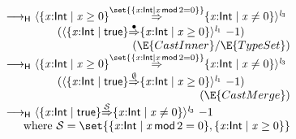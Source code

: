 \documentclass[9pt]{extarticle}
\newcommand{\ottnt}[1]{\mathit{#1}}
\newcommand{\ottsym}[1]{#1}
\begin{document}
{\begin{figure}[t]
\[\begin{array}{r@{~}l}
  \longrightarrow _{  \mathsf{H}  }  &  \langle   \{ \mathit{x} \mathord{:}  \mathsf{Int}  \mathrel{\mid}  \mathit{x}  \mathrel{\ge}  \ottsym{0}  \}   \mathord{ \overset{  \set{   \{ \mathit{x} \mathord{:}  \mathsf{Int}  \mathrel{\mid}  \mathit{x} \,  \mathsf{mod}  \, \ottsym{2}  \mathrel{=}  \ottsym{0}  \}   }  }{\Rightarrow} }   \{ \mathit{x} \mathord{:}  \mathsf{Int}  \mathrel{\mid}  \mathit{x}  \mathrel{\ne}  \ottsym{0}  \}   \rangle^{ \ottnt{l_{{\mathrm{3}}}} } ~  {} \\  &  \qquad   (  \langle   \{ \mathit{x} \mathord{:}  \mathsf{Int}  \mathrel{\mid}  \mathsf{true}  \}   \mathord{ \overset{\bullet}{\Rightarrow} }   \{ \mathit{x} \mathord{:}  \mathsf{Int}  \mathrel{\mid}  \mathit{x}  \mathrel{\ge}  \ottsym{0}  \}   \rangle^{ \ottnt{l_{{\mathrm{1}}}} } ~   {-1}   )   \\
 \multicolumn{2}{r}{(\E{CastInner}/\E{TypeSet})} \\ 
  \longrightarrow _{  \mathsf{H}  }  &  \langle   \{ \mathit{x} \mathord{:}  \mathsf{Int}  \mathrel{\mid}  \mathit{x}  \mathrel{\ge}  \ottsym{0}  \}   \mathord{ \overset{  \set{   \{ \mathit{x} \mathord{:}  \mathsf{Int}  \mathrel{\mid}  \mathit{x} \,  \mathsf{mod}  \, \ottsym{2}  \mathrel{=}  \ottsym{0}  \}   }  }{\Rightarrow} }   \{ \mathit{x} \mathord{:}  \mathsf{Int}  \mathrel{\mid}  \mathit{x}  \mathrel{\ne}  \ottsym{0}  \}   \rangle^{ \ottnt{l_{{\mathrm{3}}}} } ~  {} \\  &  \qquad   (  \langle   \{ \mathit{x} \mathord{:}  \mathsf{Int}  \mathrel{\mid}  \mathsf{true}  \}   \mathord{ \overset{ \emptyset }{\Rightarrow} }   \{ \mathit{x} \mathord{:}  \mathsf{Int}  \mathrel{\mid}  \mathit{x}  \mathrel{\ge}  \ottsym{0}  \}   \rangle^{ \ottnt{l_{{\mathrm{1}}}} } ~   {-1}   )   \\
 \multicolumn{2}{r}{(\E{CastMerge})} \\
  \longrightarrow _{  \mathsf{H}  }  &  \langle   \{ \mathit{x} \mathord{:}  \mathsf{Int}  \mathrel{\mid}  \mathsf{true}  \}   \mathord{ \overset{ \mathcal{S} }{\Rightarrow} }   \{ \mathit{x} \mathord{:}  \mathsf{Int}  \mathrel{\mid}  \mathit{x}  \mathrel{\ne}  \ottsym{0}  \}   \rangle^{ \ottnt{l_{{\mathrm{3}}}} } ~   {-1}   \\
 \multicolumn{2}{r}{\text{where } \mathcal{S}  \ottsym{=}   \set{   \{ \mathit{x} \mathord{:}  \mathsf{Int}  \mathrel{\mid}  \mathit{x} \,  \mathsf{mod}  \, \ottsym{2}  \mathrel{=}  \ottsym{0}  \}  ,   \{ \mathit{x} \mathord{:}  \mathsf{Int}  \mathrel{\mid}  \mathit{x}  \mathrel{\ge}  \ottsym{0}  \}   } } \\

\end{array}\]
\end{figure}}
\end{document}
